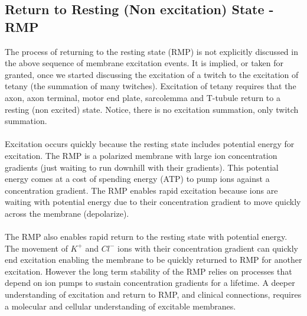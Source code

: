 
\subsection{Return to Resting (Non excitation) State - RMP}
The process of returning to the resting state (RMP) is not explicitly discussed in the above sequence of membrane excitation events. It is implied, or taken for granted, once we started discussing the excitation of a twitch to the excitation of tetany (the summation of many twitches). Excitation of tetany requires that the axon, axon terminal, motor end plate, sarcolemma and T-tubule return to a resting (non excited) state. Notice, there is no excitation summation, only twitch summation.

\paragraph{}
Excitation occurs quickly because the resting state includes potential energy for excitation. The RMP is a polarized membrane with large ion concentration gradients (just waiting to run downhill with their gradients). This potential energy comes at a cost of spending energy (ATP) to pump ions against a concentration gradient. The RMP enables rapid excitation because ions are waiting with potential energy due to their concentration gradient to move quickly across the membrane (depolarize). 

\paragraph{}
The RMP also enables rapid return to the resting state with potential energy. The movement of $K^+$ and $Cl^-$ ions with their concentration gradient can quickly end excitation enabling the membrane to be quickly returned to RMP for another excitation. However the long term stability of the RMP relies on processes that depend on ion pumps to sustain concentration gradients for a lifetime.\footnotemark{}
A deeper understanding of excitation and return to RMP, and clinical connections, requires a molecular and cellular understanding of excitable membranes.


